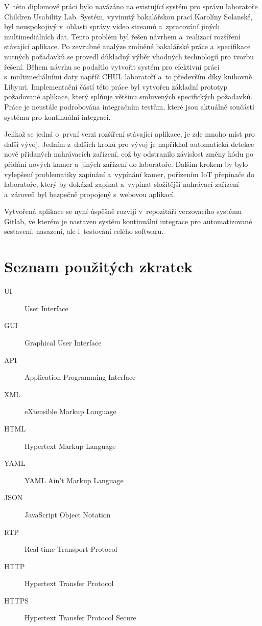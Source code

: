 \documentclass[thesis=M,czech]{FITthesis}[2012/06/26]
\begin{document}
	
\begin{conclusion}
V~této diplomové práci bylo navázáno na existující systém pro správu laboratoře Children Usability Lab. Systém, vyvinutý bakalářskou prací Karolíny Solanské, byl neuspokojivý v~oblasti správy video streamů a~zpracování jiných multimediálních dat. Tento problém byl řešen návrhem a~realizací rozšíření stávající aplikace. Po zevrubné analýze zmíněné bakalářské práce a~specifikace nutných požadavků se provedl důkladný výběr vhodných technologií pro tvorbu řešení. Během návrhu se podařilo vytvořit systém pro efektivní práci s~multimediálními daty napříč CHUL laboratoří a~to především díky knihovně Libyuri. Implementační částí této práce byl vytvořen základní prototyp požadované aplikace, který splňuje většinu smluvených specifických požadavků. Práce je neustále podrobována integračním testům, které jsou aktuálně součástí systému pro kontinuální integraci.

	Jelikož se jedná o~první verzi rozšíření stávající aplikace, je zde mnoho míst pro další vývoj. Jedním z~dalších kroků pro vývoj je například automatická detekce nově přidaných nahrávacích zařízení, což by odstranilo závislost změny kódu po přidání nových kamer a~jiných zařízení do laboratoře. Dalším krokem by bylo vylepšení problematiky zapínání a~vypínání kamer, pořízením IoT přepínače do laboratoře, který by dokázal zapínat a~vypínat složitější nahrávací zařízení a~zároveň byl bezpečně propojený s~webovou aplikací.
	
	Vytvořená aplikace se nyní úspěšně rozvijí v~repozitáři verzovacího systému Gitlab, ve kterém je nastaven systém kontinuální integrace pro automatizované sestavení, nasazení, ale i~testování celého softwaru.
\end{conclusion}

\nocite{*}



\appendix

\chapter{Seznam použitých zkratek}
\begin{description}
	\item[UI] User Interface
	\item[GUI] Graphical User Interface
	\item[API] Application Programming Interface
	\item[XML] eXtensible Markup Language
	\item[HTML] Hypertext Markup Language
	\item[YAML] YAML Ain't Markup Language
	\item[JSON] JavaScript Object Notation
	\item[RTP] Real-time Transport Protocol
	\item[HTTP] Hypertext Transfer Protocol
	\item[HTTPS] Hypertext Transfer Protocol Secure
\end{description}
\end{document}
